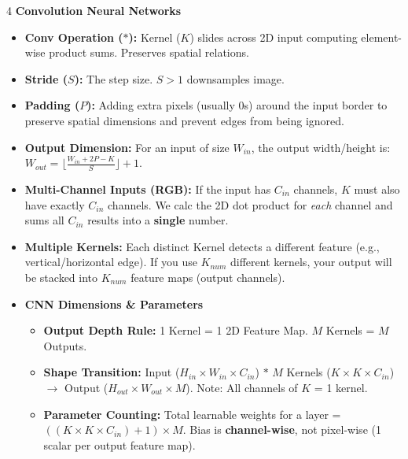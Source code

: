 \documentclass[8pt,landscape,a4paper]{extarticle}
\begin{document}
\begin{multicols*}{4}
\vspace{1mm}
\noindent\textbf{Convolution Neural Networks}
\begin{itemize}[leftmargin=*, nosep]
    \item \textbf{Conv Operation ($*$):} Kernel ($K$) slides across 2D input computing element-wise product sums. Preserves spatial relations.
    \item \textbf{Stride ($S$):} The step size. $S>1$ downsamples image.
    \item \textbf{Padding ($P$):} Adding extra pixels (usually $0$s) around the input border to preserve spatial dimensions and prevent edges from being ignored.
    \item \textbf{Output Dimension:} For an input of size $W_{in}$, the output width/height is: $W_{out} = \lfloor \frac{W_{in} + 2P - K}{S} \rfloor + 1$.
    \item \textbf{Multi-Channel Inputs (RGB):} If the input has $C_{in}$ channels, $K$ must also have exactly $C_{in}$ channels. We calc the 2D dot product for \textit{each} channel and sums all $C_{in}$ results into a \textbf{single} number. 
    \item \textbf{Multiple Kernels:} Each distinct Kernel detects a different feature (e.g., vertical/horizontal edge). If you use $K_{num}$ different kernels, your output will be stacked into $K_{num}$ feature maps (output channels). 
    \item \noindent\textbf{CNN Dimensions \& Parameters}
        \begin{itemize}[leftmargin=*, nosep]
            \item \textbf{Output Depth Rule:} 1 Kernel = 1 2D Feature Map. $M$ Kernels = $M$ Outputs. 
            \item \textbf{Shape Transition:} Input ($H_{in} \times W_{in} \times C_{in}$) $*$ $M$ Kernels ($K \times K \times C_{in}$) $\rightarrow$ Output ($H_{out} \times W_{out} \times M$).
            Note: All channels of $K$ = 1 kernel.
            \item \textbf{Parameter Counting:} Total learnable weights for a layer = $((K \times K \times C_{in}) + 1) \times M$. Bias is \textbf{channel-wise}, not pixel-wise (1 scalar per output feature map). 
        \end{itemize}
\end{itemize}


\end{multicols*}
\end{document}

